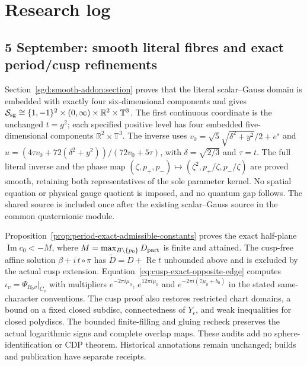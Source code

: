 \section{Research log}

\subsection*{5 September: smooth literal fibres and exact period/cusp refinements}
Section~\ref{sgd:smooth-addon:section} proves that the literal
scalar--Gauss domain is embedded with exactly four six-dimensional
components and gives
$\mathcal S_{\rm sg}\cong\{1,-1\}^2\times(0,\infty)
\times\mathbb R^2\times\mathbb T^3$.
The first continuous coordinate is the unchanged $t=g^2$; each specified
positive level has four embedded five-dimensional components
$\mathbb R^2\times\mathbb T^3$. The inverse uses
$v_0=\sqrt5\sqrt{\delta^2+y^2}/2+e^s$ and
$u=(4\tau v_0+72(\delta^2+y^2))/(72v_0+5\tau)$,
with $\delta=\sqrt{2/3}$ and $\tau=t$.
The full literal inverse and the phase map
$(\zeta,p_+,p_-)\mapsto(\zeta^2,p_+/\zeta,p_-/\zeta)$ are proved
smooth, retaining both representatives of the sole parameter kernel.
No spatial equation or physical gauge quotient is imposed, and no quantum
gap follows. The shared source is included once after the existing
scalar--Gauss source in the common quaternionic module.

Proposition~\ref{prop:period-exact-admissible-constants} proves the exact
half-plane $\operatorname{Im}c_0<-M$, where
$M=\max_{B\setminus\{p_0\}}D_{\rm part}$ is finite and attained.
The cusp-free affine solution $\beta+i\,t\circ\pi$ has
$\widetilde D=D+\operatorname{Re}t$ unbounded above and is excluded by
the actual cusp extension. Equation~\eqref{eq:cusp-exact-opposite-edge}
computes $\iota_v=\Psi_{B_0v}|_{C_v}$ with multipliers
$e^{-2\pi i\mu_0}$, $e^{12\pi i\mu_0}$ and
$e^{-2\pi i(7\mu_0+b_0)}$ in the stated same-character conventions.
The cusp proof also restores restricted chart domains, a bound on a fixed
closed subdisc, connectedness of $Y_\epsilon$, and weak inequalities for
closed polydiscs. The bounded finite-filling and gluing recheck preserves
the actual logarithmic signs and complete overlap maps. These audits
add no sphere-identification or CDP theorem. Historical annotations remain
unchanged; builds and publication have separate receipts.

